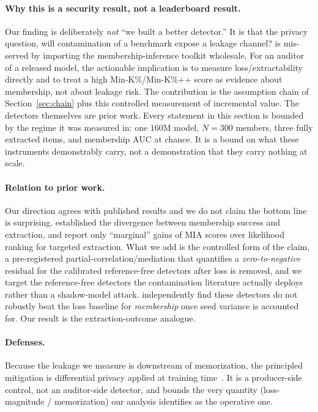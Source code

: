 \paragraph{Why this is a security result, not a leaderboard result.} Our finding is deliberately
\emph{not} ``we built a better detector.'' It is that the privacy question, will contamination of a
benchmark expose a leakage channel? is mis-served by importing the membership-inference toolkit
wholesale. For an auditor of a released model, the actionable implication is to measure
loss/extractability directly and to treat a high Min-K\%/Min-K\%++ score as evidence about
membership, not about leakage risk. The contribution is the assumption chain of
Section~\ref{sec:chain} plus this controlled measurement of incremental value. The detectors
themselves are prior work. Every statement in this section is bounded by the regime it was measured
in: one $160$M model, $N=300$ members, three fully extracted items, and membership AUC at chance. It
is a bound on what these instruments demonstrably carry, not a demonstration that they carry
nothing at scale.

\paragraph{Relation to prior work.} Our direction agrees with published results and we do not
claim the bottom line is surprising. \citet{hayes2025strong} established the divergence between
membership success and extraction, and \citet{alsahili2025effectiveness} report only ``marginal''
gains of MIA scores over likelihood ranking for targeted extraction. What we add is the controlled
form of the claim, a pre-registered partial-correlation/mediation
that quantifies a \emph{zero-to-negative} residual for the calibrated reference-free detectors after
loss is removed, and we target the reference-free detectors the contamination literature actually
deploys rather than a shadow-model attack. \citet{chen2025statistical} independently find
these detectors do not robustly beat the loss baseline for \emph{membership} once seed variance is
accounted for. Our result is the extraction-outcome analogue.

\paragraph{Defenses.} Because the leakage we measure is downstream of memorization, the principled
mitigation is differential privacy applied at training time~\citep{abadi2016deep,li2022dpllm}. It is a
producer-side control, not an auditor-side detector, and bounds the very quantity (loss-magnitude /
memorization) our analysis identifies as the operative one.
